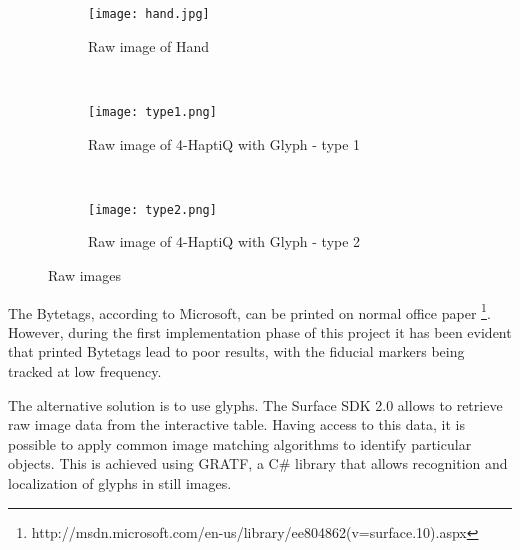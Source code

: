 \begin{figure}
        \centering
        \begin{subfigure}[H]{0.3\textwidth}
                \texttt{[image: hand.jpg]}
                \caption{Raw image of Hand}
                \label{fig:rawHand}
        \end{subfigure}%
        ~ %
        \begin{subfigure}[H]{0.3\textwidth}
                \texttt{[image: type1.png]}
                \caption{Raw image of 4-HaptiQ with Glyph - type 1}
                \label{fig:rawHaptiQ1}
        \end{subfigure}
        ~ %
        \begin{subfigure}[H]{0.3\textwidth}
                \texttt{[image: type2.png]}
                \caption{Raw image of 4-HaptiQ with Glyph - type 2}
                \label{fig:rawHaptiQ2}
        \end{subfigure}
        \caption{Raw images}\label{fig:rawImages}
\end{figure}

The Bytetags, according to Microsoft, can be printed on normal office paper \footnote{http://msdn.microsoft.com/en-us/library/ee804862(v=surface.10).aspx}. However, during the first implementation phase of this project it has been evident that printed Bytetags lead to poor results, with the fiducial markers being tracked at low frequency.

The alternative solution is to use glyphs. The Surface SDK 2.0 allows to retrieve raw image data from the interactive table. Having access to this data, it is possible to apply common image matching algorithms to identify particular objects. This is achieved using GRATF, a C\# library that allows recognition and localization of glyphs in still images. 

